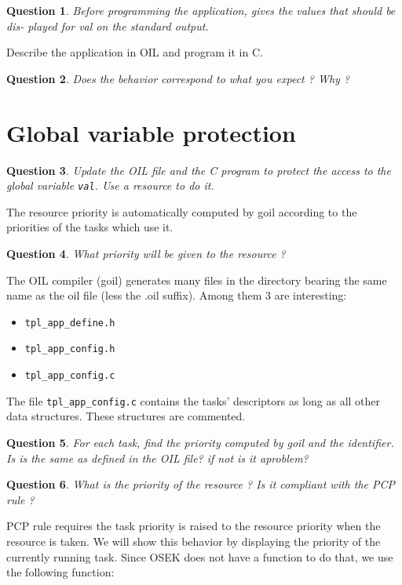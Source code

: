 \documentclass[11pt]{article}
\newtheorem{ex}{Question}
\begin{document}
\begin{ex}
Before programming the application, gives the values that should be dis- played for val on the standard output.
\end{ex}

Describe the application in OIL and program it in C.

\begin{ex}
Does the behavior correspond to what you expect ? Why ?
\end{ex}

\section{Global variable protection}

\begin{ex}
Update the OIL file and the C program to protect the access to the global variable \texttt{val}. Use a resource to do it.
\end{ex}

The resource priority is automatically computed by goil according to the priorities of the tasks which use it.

\begin{ex}
What priority will be given to the resource ?
\end{ex}

The OIL compiler (goil) generates many files in the directory bearing the same name
as the oil file (less the .oil suffix). Among them 3 are interesting:
\begin{itemize}
\item \texttt{tpl_app_define.h}
\item \texttt{tpl_app_config.h}
\item \texttt{tpl_app_config.c}
\end{itemize}

The file \texttt{tpl_app_config.c} contains the tasks' descriptors as long as all other data structures. These structures are commented.

\begin{ex}
For each task, find the priority computed by goil and the identifier. Is is the same as defined in the OIL file? if not is it aproblem?
\end{ex}

\begin{ex}
What is the priority of the resource ? Is it compliant with the PCP rule ?
\end{ex}

PCP rule requires the task priority is raised to the resource priority when the resource is taken. We will show this behavior by displaying the priority of the currently running task. Since OSEK does not have a function to do that, we use the following function:
\end{document}
